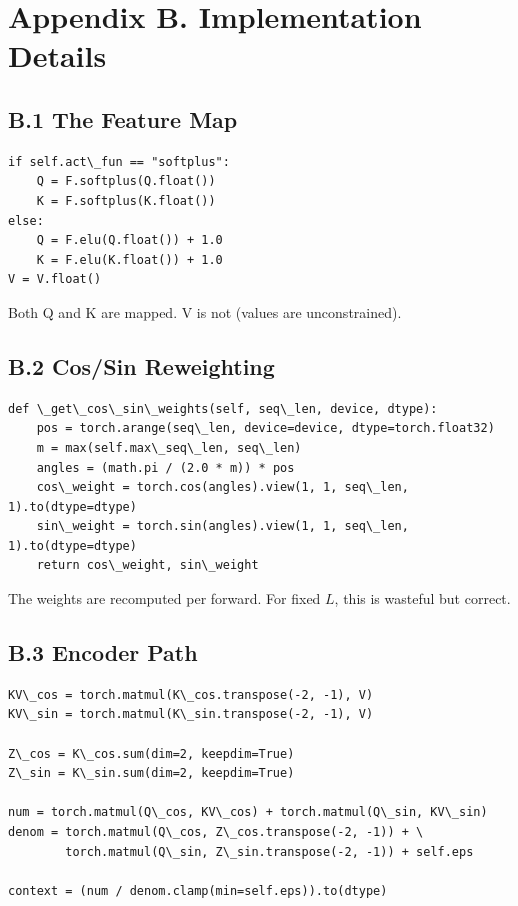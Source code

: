 
\section{Appendix B. Implementation Details}

\subsection{B.1 The Feature Map}

\begin{lstlisting}
if self.act\_fun == "softplus":
    Q = F.softplus(Q.float())
    K = F.softplus(K.float())
else:
    Q = F.elu(Q.float()) + 1.0
    K = F.elu(K.float()) + 1.0
V = V.float()
\end{lstlisting}

Both Q and K are mapped. V is not (values are unconstrained).

\subsection{B.2 Cos/Sin Reweighting}

\begin{lstlisting}
def \_get\_cos\_sin\_weights(self, seq\_len, device, dtype):
    pos = torch.arange(seq\_len, device=device, dtype=torch.float32)
    m = max(self.max\_seq\_len, seq\_len)
    angles = (math.pi / (2.0 * m)) * pos
    cos\_weight = torch.cos(angles).view(1, 1, seq\_len, 1).to(dtype=dtype)
    sin\_weight = torch.sin(angles).view(1, 1, seq\_len, 1).to(dtype=dtype)
    return cos\_weight, sin\_weight
\end{lstlisting}

The weights are recomputed per forward. For fixed $L$, this is wasteful 
but correct.

\subsection{B.3 Encoder Path}

\begin{lstlisting}
KV\_cos = torch.matmul(K\_cos.transpose(-2, -1), V)
KV\_sin = torch.matmul(K\_sin.transpose(-2, -1), V)

Z\_cos = K\_cos.sum(dim=2, keepdim=True)
Z\_sin = K\_sin.sum(dim=2, keepdim=True)

num = torch.matmul(Q\_cos, KV\_cos) + torch.matmul(Q\_sin, KV\_sin)
denom = torch.matmul(Q\_cos, Z\_cos.transpose(-2, -1)) + \
        torch.matmul(Q\_sin, Z\_sin.transpose(-2, -1)) + self.eps

context = (num / denom.clamp(min=self.eps)).to(dtype)
\end{lstlisting}

